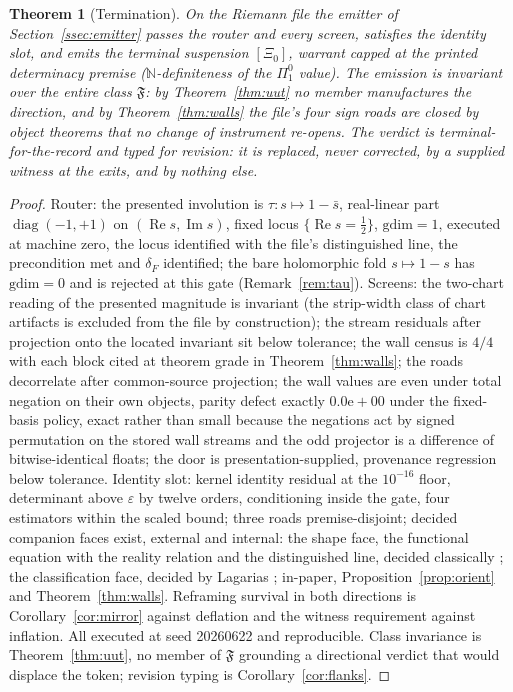 \documentclass[twocolumn,10pt]{article}
\theoremstyle{plain}
\newtheorem{theorem}{Theorem}[section]
\theoremstyle{definition}
\newcommand{\tXi}{[\Xi_0]}
\newcommand{\N}{\mathbb{N}}
\newcommand{\Fr}{\mathfrak{F}}
\begin{document}
\begin{theorem}[Termination]\label{thm:term}
On the Riemann file the emitter of Section~\ref{ssec:emitter} passes the router and every screen, satisfies the identity slot, and emits the terminal suspension $\tXi$, warrant capped at the printed determinacy premise ($\N$-definiteness of the $\Pi^0_1$ value). The emission is invariant over the entire class $\Fr$: by Theorem~\ref{thm:uut} no member manufactures the direction, and by Theorem~\ref{thm:walls} the file's four sign roads are closed by object theorems that no change of instrument re-opens. The verdict is terminal-for-the-record and typed for revision: it is replaced, never corrected, by a supplied witness at the exits, and by nothing else.
\end{theorem}
\begin{proof}
Router: the presented involution is $\tau\colon s\mapsto 1-\bar s$, real-linear part $\operatorname{diag}(-1,+1)$ on $(\operatorname{Re}s,\operatorname{Im}s)$, fixed locus $\{\operatorname{Re}s=\tfrac12\}$, $\mathrm{gdim}=1$, executed at machine zero, the locus identified with the file's distinguished line, the precondition met and $\delta_F$ identified; the bare holomorphic fold $s\mapsto 1-s$ has $\mathrm{gdim}=0$ and is rejected at this gate (Remark~\ref{rem:tau}). Screens: the two-chart reading of the presented magnitude is invariant (the strip-width class of chart artifacts is excluded from the file by construction); the stream residuals after projection onto the located invariant sit below tolerance; the wall census is $4/4$ with each block cited at theorem grade in Theorem~\ref{thm:walls}; the roads decorrelate after common-source projection; the wall values are even under total negation on their own objects, parity defect exactly $0.0\mathrm{e}{+}00$ under the fixed-basis policy, exact rather than small because the negations act by signed permutation on the stored wall streams and the odd projector is a difference of bitwise-identical floats; the door is presentation-supplied, provenance regression below tolerance. Identity slot: kernel identity residual at the $10^{-16}$ floor, determinant above $\varepsilon$ by twelve orders, conditioning inside the gate, four estimators within the scaled bound; three roads premise-disjoint; decided companion faces exist, external and internal: the shape face, the functional equation with the reality relation and the distinguished line, decided classically \cite{Riemann1859}; the classification face, decided by Lagarias \cite{Lagarias2002}; in-paper, Proposition~\ref{prop:orient} and Theorem~\ref{thm:walls}. Reframing survival in both directions is Corollary~\ref{cor:mirror} against deflation and the witness requirement against inflation. All executed at seed 20260622 and reproducible. Class invariance is Theorem~\ref{thm:uut}, no member of $\Fr$ grounding a directional verdict that would displace the token; revision typing is Corollary~\ref{cor:flanks}.
\end{proof}
\end{document}
